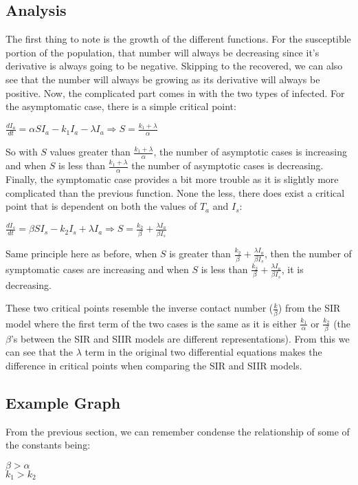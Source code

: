 \documentclass[12pt]{article} %
\begin{document}
\subsection{Analysis}
The first thing to note is the growth of the different functions. For the susceptible portion of the population, that number will always be decreasing since it's derivative is always going to be negative. Skipping to the recovered, we can also see that the number will always be growing as its derivative will always be positive. Now, the complicated part comes in with the two types of infected. For the asymptomatic case, there is a simple critical point:
\begin{center}
$\frac{dI_a}{dt} = \alpha SI_a - k_1I_a - \lambda I_a \Rightarrow S = \frac{k_1+\lambda}{\alpha}$\\
\end{center}

So with $S$ values greater than $\frac{k_1+\lambda}{\alpha}$, the number of asymptotic cases is increasing and when $S$ is less than $\frac{k_1+\lambda}{\alpha}$ the number of asymptotic cases is decreasing. Finally, the symptomatic case provides a bit more trouble as it is slightly more complicated than the previous function. None the less, there does exist a critical point that is dependent on both the values of $T_a$ and $I_s$:
\begin{center}
$\frac{dI_s}{dt} = \beta SI_s - k_2I_s + \lambda I_a \Rightarrow S = \frac{k_2}{\beta} + \frac{\lambda I_a}{\beta I_s}$
\end{center}

Same principle here as before, when $S$ is greater than $\frac{k_2}{\beta} + \frac{\lambda I_a}{\beta I_s}$, then the number of symptomatic cases are increasing and when $S$ is less than $\frac{k_2}{\beta} + \frac{\lambda I_a}{\beta I_s}$, it is decreasing.

These two critical points resemble the inverse contact number ($\frac{k}{\beta}$) from the SIR model where the first term of the two cases is the same as it is either $\frac{k_1}{\alpha}$ or $\frac{k_2}{\beta}$ (the $\beta$'s between the SIR and SIIR models are different representations). From this we can see that the $\lambda$ term in the original two differential equations makes the difference in critical points when comparing the SIR and SIIR models.
\subsection{Example Graph}
From the previous section, we can remember condense the relationship of some of the constants being:
\begin{center}
$\beta > \alpha$\\
$k_1 > k_2$
\end{center}
\end{document}
